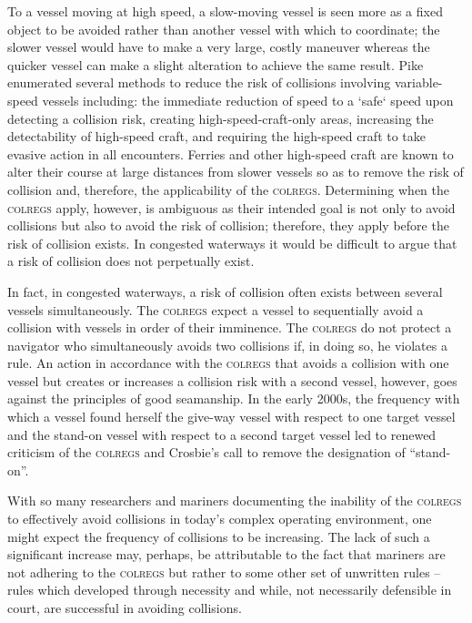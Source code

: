 \documentclass[twoside,symmetric,notoc]{tufte-book}
\begin{document}
\par{%
To a vessel moving at high speed, a slow-moving vessel is seen more as a fixed object to be avoided rather than another vessel with which to coordinate; the slower vessel would have to make a very large, costly maneuver whereas the quicker vessel can make a slight alteration to achieve the same result. Pike enumerated several methods to reduce the risk of collisions involving variable-speed vessels including: the immediate reduction of speed to a `safe` speed upon detecting a collision risk, creating high-speed-craft-only areas, increasing the detectability of high-speed craft, and requiring the high-speed craft to take evasive action in all encounters. Ferries and other high-speed craft are known to alter their course at large distances from slower vessels so as to remove the risk of collision and, therefore, the applicability of the \textsc{colregs}. Determining when the \textsc{colregs} apply, however, is ambiguous as their intended goal is not only to avoid collisions but also to avoid the risk of collision; therefore, they apply before the risk of collision exists.\cite{Zhao} In congested waterways it would be difficult to argue that a risk of collision does not perpetually exist.
}
\par{%
In fact, in congested waterways, a risk of collision often exists between several vessels simultaneously. The \textsc{colregs} expect a vessel to sequentially avoid a collision with vessels in order of their imminence. The \textsc{colregs} do not protect a navigator who simultaneously avoids two collisions if, in doing so, he violates a rule. An action in accordance with the \textsc{colregs} that avoids a collision with one vessel but creates or increases a collision risk with a second vessel, however, goes against the principles of good seamanship.  In the early 2000s, the frequency with which a vessel found herself the give-way vessel with respect to one target vessel and the stand-on vessel with respect to a second target vessel led to renewed criticism of the \textsc{colregs} and Crosbie's call to remove the designation of ``stand-on''.\cite{Stitt}
}
\par{With so many researchers and mariners documenting the inability of the \textsc{colregs} to effectively avoid collisions in today's complex operating environment, one might expect the frequency of collisions to be increasing. The lack of such a significant increase may, perhaps, be attributable to the fact that mariners are not adhering to the \textsc{colregs} but rather to some other set of unwritten rules -- rules which developed through necessity and while, not necessarily defensible in court, are successful in avoiding collisions. 
}
\end{document}

